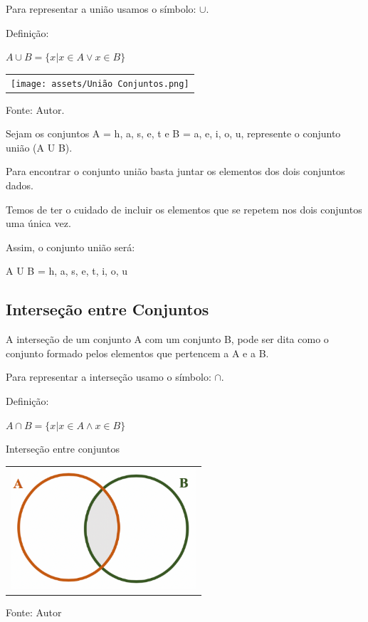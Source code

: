 \begin{multicols*}{2}
    Para representar a união usamos o símbolo: $ \mathbf{ \cup } $.

    Definição:

    $A\cup B=\{x|x\in A\lor x\in B\}$

    \begin{tabular}{@{}c@{}}
        \texttt{[image: assets/União Conjuntos.png]}
    \end{tabular}

    Fonte: Autor.

    Sejam os conjuntos A = {h, a, s, e, t} e B = {a, e, i, o, u}, represente o conjunto união (A U B).

    Para encontrar o conjunto união basta juntar os elementos dos dois conjuntos dados.

    Temos de ter o cuidado de incluir os elementos que se repetem nos dois conjuntos uma única vez.

    Assim, o conjunto união será:

    A U B = {h, a, s, e, t, i, o, u}

    \subsection{Interseção entre Conjuntos}

    A interseção de um conjunto A com um conjunto B, pode ser dita como o conjunto formado pelos elementos que pertencem a A e a B.

    Para representar a interseção usamo o símbolo: $ \cap $.

    Definição:

    $\displaystyle A\cap B=\{x|x\in A\land x\in B\}$

    Interseção entre conjuntos\\

    \begin{tabular}{@{}c@{}}
        \includegraphics[height=45mm]{assets/Conjunto Intersecção.png}
    \end{tabular}

    Fonte: Autor


\end{multicols*}
